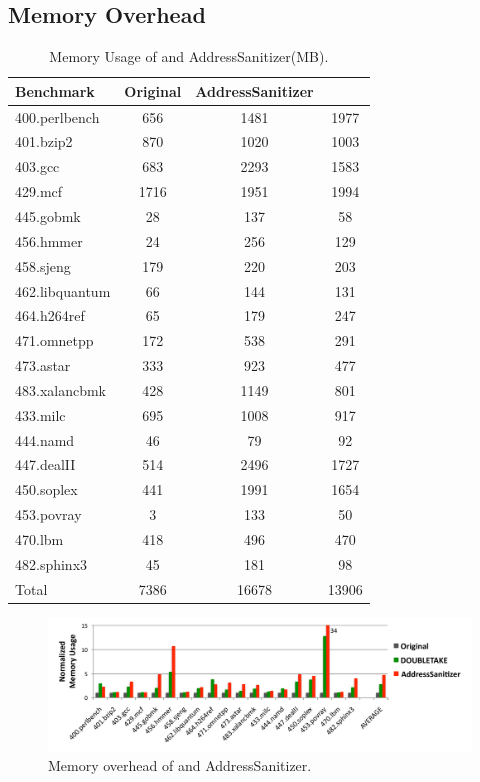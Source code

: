 \subsection{Memory Overhead}
\label{sec:memoverhead}

\begin{table}[t]
\centering
\begin{tabular}{l|c|c|c|}
\textbf{ \small Benchmark} & \textbf{\small Original} &  \textbf{\small AddressSanitizer} & \textbf{\small \doubletake{} } \\
\hline
400.perlbench & 656 &	1481 & 1977 \\
401.bzip2	& 870 &	1020 &	1003 \\
403.gcc	& 683 &	2293 &	1583 \\
429.mcf	& 1716 &	1951 &	1994 \\
445.gobmk &	28 &	137 &	58 \\
456.hmmer &	24 &	256 &	129 \\
458.sjeng & 179 & 220 &	203 \\
462.libquantum	& 66 &	144 &	131 \\
464.h264ref	& 65 &	179 &	247 \\
471.omnetpp	& 172 &	538 &	291 \\
473.astar	& 333 &	923 &	477 \\
483.xalancbmk &	428 & 1149 &	801 \\
433.milc	& 695 &	1008 &	917 \\
444.namd	& 46 &	79 &	92 \\
447.dealII	& 514 &	2496 &	1727 \\
450.soplex	& 441 &	1991 &	1654 \\
453.povray	& 3 &	133 &	50 \\
470.lbm	& 418 &	496 &	470 \\
482.sphinx3 &	45 &	181 & 98 \\
\hline
Total & 7386 & 16678 & 13906 \\
\hline
\end{tabular}
\caption{Memory Usage of \doubletake{} and AddressSanitizer(MB).\label{tbl:memoryoverhead}}
\end{table}


\begin{figure}
\begin{center}
\includegraphics[width=6.5in]{figure/memory}
\end{center}
\caption{
Memory overhead of \doubletake{} and AddressSanitizer.
\label{fig:memory}}
\end{figure}


